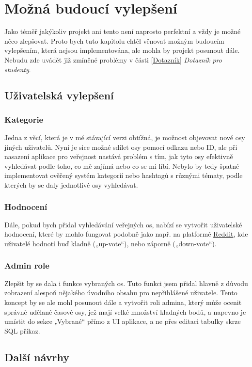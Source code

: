 \section{Možná budoucí vylepšení}
Jako téměř jakýkoliv projekt ani tento není naprosto perfektní a vždy je možné něco zlepšovat. Proto bych tuto kapitolu chtěl věnovat možným budoucím vylepšením, která nejsou implementována, ale mohla by projekt posunout dále. Nebudu zde uvádět již zmíněné problémy v části \ref{Dotazník} \textit{Dotazník pro studenty}.

\subsection{Uživatelská vylepšení}

\subsubsection{Kategorie}
Jedna z věcí, která je v mé stávající verzi obtížná, je možnost objevovat nové osy jiných uživatelů. Nyní je sice možné sdílet osy pomocí odkazu nebo ID, ale při nasazení aplikace pro veřejnost nastává problém s tím, jak tyto osy efektivně vyhledávat podle toho, co mě zajímá nebo co se mi líbí. Nebylo by tedy špatné implementovat ověřený systém kategorií nebo hashtagů s různými tématy, podle kterých by se daly jednotlivé osy vyhledávat. 

\subsubsection{Hodnocení}
Dále, pokud bych přidal vyhledávání veřejných os, nabízí se vytvořit uživatelské hodnocení, které by mohlo fungovat podobně jako např. na platformě \href{https://www.reddit.com/}{Reddit}, kde uživatelé hodnotí buď kladně („up-vote“), nebo záporně („down-vote“).

\subsubsection{Admin role}
Zlepšit by se dala i funkce vybraných os. Tuto funkci jsem přidal hlavně z důvodu zobrazení alespoň nějakého úvodního obsahu pro nepřihlášené uživatele. Tento koncept by se ale mohl posunout dále a vytvořit roli admina, který může ocenit správně udělané časové osy, jež mají velké množství kladných bodů, a napevno je umístit do sekce „Vybrané“ přímo z UI aplikace, a ne přes editaci tabulky skrze SQL příkaz.

\subsection{Další návrhy}

